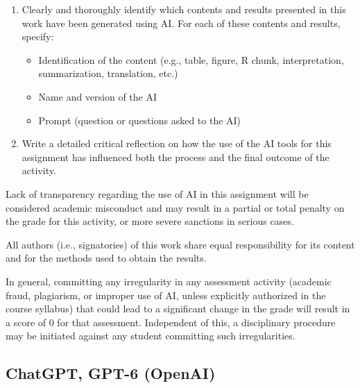 \documentclass[a4paper,10pt]{article}\usepackage[]{graphicx}\usepackage[]{xcolor}
\begin{document}
\begin{enumerate}
    \item Clearly and thoroughly identify which contents and results presented in this work have been generated using AI. For each of these contents and results, specify:
    \begin{itemize}
        \item Identification of the content (e.g., table, figure, R chunk, interpretation, summarization, translation, etc.)
        \item Name and version of the AI
        \item Prompt (question or questions asked to the AI)
    \end{itemize}

    \item Write a detailed critical reflection on how the use of the AI tools for this assignment has influenced both the process and the final outcome of the activity.
\end{enumerate}

Lack of transparency regarding the use of AI in this assignment will be considered academic misconduct and may result in a partial or total penalty on the grade for this activity, or more severe sanctions in serious cases.

All authors (i.e., signatories) of this work share equal responsibility for its content and for the methods used to obtain the results.

In general, committing any irregularity in any assessment activity (academic fraud, plagiarism, or improper use of AI, unless explicitly authorized in the course syllabus) that could lead to a significant change in the grade will result in a score of 0 for that assessment. Independent of this, a disciplinary procedure may be initiated against any student committing such irregularities.



\subsection*{ChatGPT, GPT-6 (OpenAI)}
\end{document}
